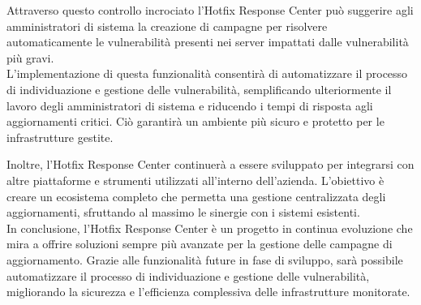 Attraverso questo controllo incrociato l’Hotfix Response Center può suggerire agli 
amministratori di sistema la creazione di campagne per risolvere automaticamente le 
vulnerabilità presenti nei server impattati dalle vulnerabilità più gravi.\\

L'implementazione di questa funzionalità consentirà di automatizzare il processo di 
individuazione e gestione delle vulnerabilità, semplificando ulteriormente il lavoro degli 
amministratori di sistema e riducendo i tempi di risposta agli aggiornamenti critici. Ciò 
garantirà un ambiente più sicuro e protetto per le infrastrutture gestite.

Inoltre, l'Hotfix Response Center continuerà a essere sviluppato per integrarsi con altre 
piattaforme e strumenti utilizzati all'interno dell'azienda. L'obiettivo è creare un ecosistema 
completo che permetta una gestione centralizzata degli aggiornamenti, sfruttando 
al massimo le sinergie con i sistemi esistenti.\\

In conclusione, l'Hotfix Response Center è un progetto in continua evoluzione che mira a offrire 
soluzioni sempre più avanzate per la gestione delle campagne di aggiornamento. Grazie alle 
funzionalità future in fase di sviluppo, sarà possibile automatizzare il processo di 
individuazione e gestione delle vulnerabilità, migliorando la sicurezza e l'efficienza 
complessiva delle infrastrutture monitorate.
